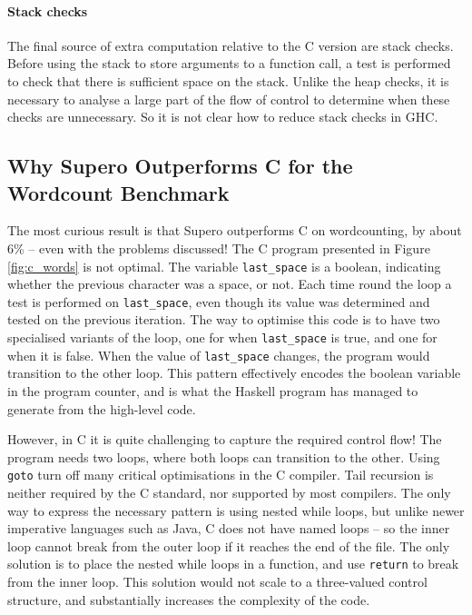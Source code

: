 \documentclass{llncs}
\begin{document}
\paragraph{Stack checks}

The final source of extra computation relative to the C version are stack checks. Before using the stack to store arguments to a function call, a test is performed to check that there is sufficient space on the stack. Unlike the heap checks, it is necessary to analyse a large part of the flow of control to determine when these checks are unnecessary. So it is not clear how to reduce stack checks in GHC.

\subsection{Why Supero Outperforms C for the Wordcount Benchmark}

The most curious result is that Supero outperforms C on wordcounting, by about 6\% -- even with the problems discussed! The C program presented in Figure \ref{fig:c_words} is not optimal. The variable \verb"last_space" is a boolean, indicating whether the previous character was a space, or not. Each time round the loop a test is performed on \verb"last_space", even though its value was determined and tested on the previous iteration. The way to optimise this code is to have two specialised variants of the loop, one for when \verb"last_space" is true, and one for when it is false. When the value of \verb"last_space" changes, the program would transition to the other loop. This pattern effectively encodes the boolean variable in the program counter, and is what the Haskell program has managed to generate from the high-level code.

However, in C it is quite challenging to capture the required control flow! The program needs two loops, where both loops can transition to the other. Using \texttt{goto} turn off many critical optimisations in the C compiler. Tail recursion is neither required by the C standard, nor supported by most compilers. The only way to express the necessary pattern is using nested while loops, but unlike newer imperative languages such as Java, C does not have named loops -- so the inner loop cannot break from the outer loop if it reaches the end of the file. The only solution is to place the nested while loops in a function, and use \texttt{return} to break from the inner loop. This solution would not scale to a three-valued control structure, and substantially increases the complexity of the code.
\end{document}
